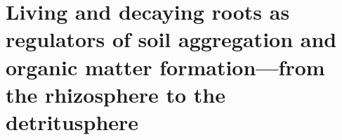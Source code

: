 \chapter{Living and decaying roots as regulators of soil aggregation and organic matter formation---from the rhizosphere to the detritusphere}
\label{chap:manuscript5} %